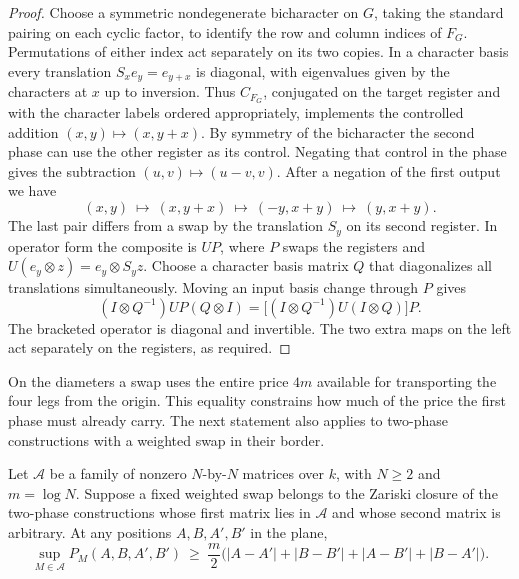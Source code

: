 \begin{proof}
Choose a symmetric nondegenerate bicharacter on $G$, taking the
standard pairing on each cyclic factor, to identify the row and
column indices of $F_G$. Permutations of either index act separately
on its two copies. In a character basis every translation
$S_x e_y=e_{y+x}$ is diagonal, with eigenvalues given by the
characters at $x$ up to inversion. Thus $C_{F_G}$, conjugated on the
target register and with the character labels ordered appropriately,
implements the controlled addition $(x,y)\mapsto(x,y+x)$. By symmetry
of the bicharacter the second phase can use the other register as its
control. Negating that control in the phase gives the subtraction
$(u,v)\mapsto(u-v,v)$. After a negation of the first output we have
\[
       (x,y)\ \longmapsto\ (x,y+x)\
         \longmapsto\ (-y,x+y)\ \longmapsto\ (y,x+y).
\]
The last pair differs from a swap by the translation $S_y$ on its
second register. In operator form the composite is $UP$, where $P$
swaps the registers and $U(e_y\otimes z)=e_y\otimes S_yz$. Choose a
character basis matrix $Q$ that diagonalizes all translations
simultaneously. Moving an input basis change through $P$ gives
\[
 (I\otimes Q^{-1})UP(Q\otimes I)
       =\bigl[(I\otimes Q^{-1})U(I\otimes Q)\bigr]P .
\]
The bracketed operator is diagonal and invertible. The two extra maps
on the left act separately on the registers, as required.
\end{proof}

On the diameters a swap uses the entire price $4m$ available for
transporting the four legs from the origin. This equality constrains
how much of the price the first phase must already carry. The next
statement also applies to two-phase constructions with a weighted swap
in their border.

\begin{proposition}\label{geo:first-phase}
Let $\mathcal A$ be a family of nonzero $N$-by-$N$ matrices over $k$,
with $N\ge2$ and $m=\log N$. Suppose a fixed weighted swap belongs
to the Zariski closure of the two-phase constructions whose first
matrix lies in $\mathcal A$ and whose second matrix is arbitrary.
At any positions $A,B,A',B'$ in the plane,
\begin{equation}\label{geo:four-legs}
 \sup_{M\in\mathcal A}P_M(A,B,A',B')
 \ \ge\ \frac m2
  \bigl(|A-A'|+|B-B'|+|A-B'|+|B-A'|\bigr).
\end{equation}
\end{proposition}

